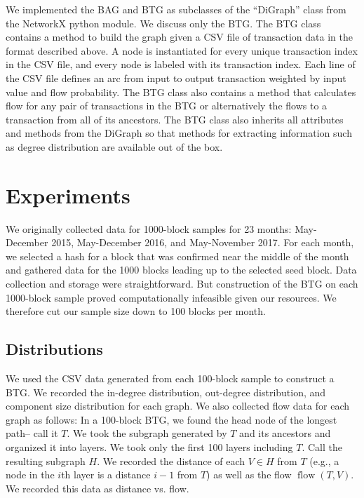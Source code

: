 \documentclass[letterpaper, 10 pt, conference]{ieeeconf}  %
\newcommand{\flow}{\operatorname{flow}}
\begin{document}
We implemented the BAG and BTG as subclasses of the ``DiGraph'' class  from the NetworkX python module. We discuss only the BTG. The BTG class contains a method to build the graph given a CSV file of transaction data in the format described above. A node is instantiated for every unique transaction index in the CSV file, and every node is labeled with its transaction index. Each line of the CSV file defines an arc from input to output transaction weighted by input value and flow probability. The BTG class also contains a method that calculates flow for any pair of transactions in the BTG or alternatively the flows to a transaction from all of its ancestors. The BTG class also inherits all attributes and methods from the DiGraph so that methods for extracting information such as degree distribution are available out of the box.


\section{Experiments}

We originally collected data for 1000-block samples for 23 months: May-December 2015, May-December 2016, and May-November 2017. For each month, we selected a hash for a block that was confirmed near the middle of the month and gathered data for the 1000 blocks leading up to the selected seed block. Data collection and storage were straightforward. But construction of the BTG on each 1000-block sample proved computationally infeasible given our resources. We therefore cut our sample size down to 100 blocks per month.

\subsection{Distributions}

We used the CSV data generated from each 100-block sample to construct a BTG. We recorded the in-degree distribution, out-degree distribution, and component size distribution for each graph. We also collected flow data for each graph as follows: In a 100-block BTG, we found the head node of the longest path-- call it $T$. We took the subgraph generated by $T$ and its ancestors and organized it into layers. We took only the first 100 layers including $T$. Call the resulting subgraph $H$. We recorded the distance of each $V\in H$ from $T$ (e.g., a node in the $i$th layer is a distance $i-1$ from $T$) as well as the flow $\flow(T, V)$. We recorded this data as distance vs. flow.
\end{document}
